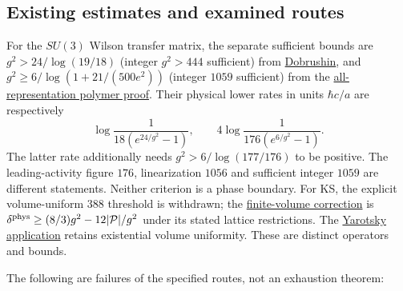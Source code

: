 \documentclass[11pt,a4paper]{article}
\begin{document}
\subsection{Existing estimates and examined
routes}\label{existing-estimates-and-examined-routes}

For the \(SU(3)\) Wilson transfer matrix, the separate sufficient bounds
are \(g^2>24/\log(19/18)\) (integer \(g^2>444\) sufficient) from
\href{dobrushin-uniqueness-wilson.md}{Dobrushin}, and
\(g^2\ge6/\log(1+21/(500e^2))\) (integer \(1059\) sufficient) from the
\href{wilson-strong-coupling-explicit.md}{all-representation polymer
proof}. Their physical lower rates in units \(\hbar c/a\) are
respectively \[
 \log\frac1{18(e^{24/g^2}-1)},\qquad
 4\log\frac1{176(e^{6/g^2}-1)}.
\] The latter rate additionally needs \(g^2>6/\log(177/176)\) to be
positive. The leading-activity figure \(176\), linearization \(1056\)
and sufficient integer \(1059\) are different statements. Neither
criterion is a phase boundary. For KS, the explicit volume-uniform
\(388\) threshold is withdrawn; the
\href{strong-coupling-uniform-gap.md\#continuous-time-histories-and-the-corrected-overlap-criterion}{finite-volume
correction} is \(\delta^{\rm phys}\ge(8/3)g^2-12|\mathcal P|/g^2\) under
its stated lattice restrictions. The
\href{strong-coupling-uniform-gap.md}{Yarotsky application} retains
existential volume uniformity. These are distinct operators and bounds.

The following are failures of the specified routes, not an exhaustion
theorem:
\end{document}
